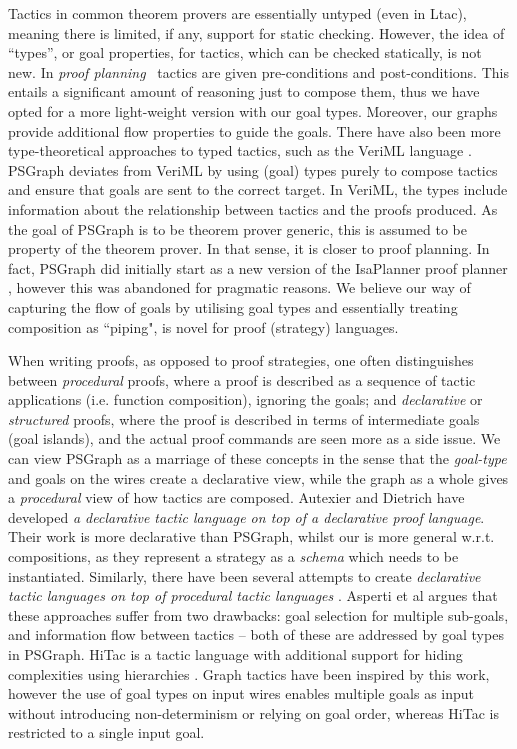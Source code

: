 \documentclass{llncs}
\begin{document}
Tactics in common theorem provers are essentially untyped (even in {\cal L}tac), meaning there is
limited, if any, support for static checking. However, the idea of ``types'', or goal properties, for tactics, which can be checked 
statically, is not new.  In  \emph{proof planning}~\cite{Bundy91} tactics are given pre-conditions and post-conditions. This entails a significant amount of reasoning just to compose them, thus we have opted for a more light-weight version with our goal types. Moreover, our graphs provide additional flow properties to guide the goals.  
There have also been more type-theoretical approaches to typed tactics,
such as the VeriML language \cite{Stampoulis10}. PSGraph deviates from VeriML by
using (goal) types purely to compose tactics and ensure that goals are sent to the correct target. In VeriML, the types include information about the relationship between tactics and the proofs produced. As the goal of PSGraph is to be theorem prover generic, this is assumed to be property of the theorem prover. In that sense, it is closer to proof planning. In fact, PSGraph did  initially start as a new version of the IsaPlanner proof planner \cite{paper:Dixon:03}, however this was abandoned for pragmatic reasons.
We believe our way of capturing the flow of goals by utilising goal types and 
essentially treating composition as ``piping", is novel for proof (strategy) languages.

When writing proofs, as opposed to proof strategies, one often 
distinguishes between \emph{procedural} proofs, where a proof is described as a sequence of tactic applications (i.e. function composition), ignoring the goals; and \emph{declarative} or \emph{structured} proofs, where the proof is described in terms of intermediate goals (goal islands), and the actual proof  commands are seen more as a side issue.  We can view PSGraph as a marriage of these concepts in the sense that the \emph{goal-type} and goals on the wires create a declarative view, while the graph as a whole gives a \emph{procedural} view of how tactics are composed.
Autexier and Dietrich \cite{Autexier10} have developed \emph{a declarative tactic language on top of a declarative proof language}. Their work is more declarative than PSGraph, whilst our is more general w.r.t. compositions, as they represent a strategy as a \emph{schema} which needs to be instantiated. 
Similarly, there have been several attempts to create \emph{declarative tactic languages on top of procedural tactic languages} \cite{Harrison96,Giero:07}. Asperti et al \cite{Asperti09} argues that these approaches suffer from two
drawbacks: goal selection for multiple sub-goals, and information flow between tactics -- both of these are addressed by goal types in PSGraph. HiTac is a tactic language with additional support for hiding complexities using hierarchies \cite{paper:Aspinall:2008,paper:Whiteside:11}. Graph tactics have been inspired by this work, however the use of goal types on input wires enables multiple
goals as input without introducing non-determinism or relying on goal order, whereas HiTac is restricted to a single input goal.
\end{document}
